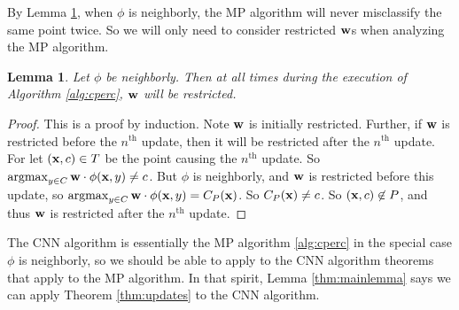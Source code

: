\documentclass{article}
\newcommand{\argmax}{\operatornamewithlimits{argmax}}
\newcommand{\tth}{ \text{th}}
\newtheorem{lemma}{Lemma}
\begin{document}
By Lemma \ref{thm:restricted}, when $\phi$ is neighborly, the MP algorithm will never misclassify the same point twice. So we will only need to consider restricted ${\bf w}$s when analyzing the MP algorithm. 

\begin{lemma}
\label{thm:restricted}
Let $\phi$ be neighborly. Then at all times during the execution of Algorithm \ref{alg:cperc}, ${\bf w}$ will be restricted.
\end{lemma}
\begin{proof}
This is a proof by induction. Note ${\bf w}$ is initially restricted. 
Further, if ${\bf w}$ is restricted before the $n^\tth$ update, then it will be restricted after the $n^\tth$ update. 
For let $({\bf x},c) \in T$ be the point causing the $n^\tth$ update. So $\argmax_{y \in C} {\bf w} \cdot \phi({\bf x},y) \neq c$. But $\phi$ is neighborly, and ${\bf w}$ is restricted before this update, so $\argmax_{y \in C} {\bf w} \cdot \phi({\bf x},y) = C_P({\bf x})$. So $C_P({\bf x}) \neq c$. So $({\bf x},c) \not \in P$, and thus ${\bf w}$ is restricted after the $n^\tth$ update.
\end{proof}

The CNN algorithm is essentially the MP algorithm \ref{alg:cperc} in the special case $\phi$ is neighborly, so we should be able to apply to the CNN algorithm theorems that apply to the MP algorithm. In that spirit, Lemma \ref{thm:mainlemma} says we can apply Theorem \ref{thm:updates} to the CNN algorithm.
\end{document}
